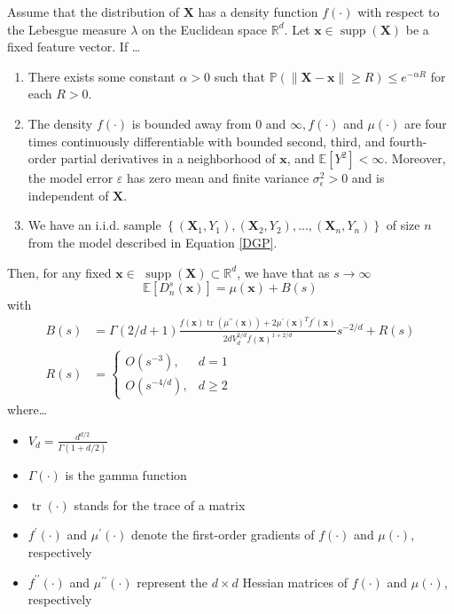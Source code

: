 \documentclass[letterpaper,10pt]{article}
\numberwithin{equation}{section}
\numberwithin{theorem}{section}
\numberwithin{remark}{section}
\numberwithin{example}{section}
\theoremstyle{definition}
\newcommand{\1}{\mathbb{1}}
\begin{document}
\vspace{0.5cm}
\begin{theorem}\label{demirkaya_Thm1}
	Assume that the distribution of $\mathbf{X}$ has a density function $f(\cdot)$ with respect to the Lebesgue measure $\lambda$ on the Euclidean space $\mathbb{R}^d$.
	Let $\mathbf{x} \in \operatorname{supp}(\mathbf{X})$ be a fixed feature vector.
	If \dots
	\begin{enumerate}
		\item There exists some constant $\alpha>0$ such that $\mathbb{P}(\|\mathbf{X}-\mathbf{x}\| \geq R) \leq e^{-\alpha R}$ for each $R>0$.
		\item The density $f(\cdot)$ is bounded away from 0 and $\infty, f(\cdot)$ and $\mu(\cdot)$ are four times continuously differentiable with bounded second, third, and fourth-order partial derivatives in a neighborhood of $\mathbf{x}$, and $\mathbb{E}[Y^2]<\infty$.
		      Moreover, the model error $\varepsilon$ has zero mean and finite variance $\sigma_\epsilon^2>0$ and is independent of $\mathbf{X}$.
		\item We have an i.i.d. sample $\left\{\left(\mathbf{X}_1, Y_1\right),\left(\mathbf{X}_2, Y_2\right), \dotsc,\left(\mathbf{X}_n, Y_n\right)\right\}$ of size $n$ from the model described in Equation \ref{DGP}.
	\end{enumerate}
	Then, for any fixed $\mathbf{x} \in$ $\operatorname{supp}(\mathbf{X}) \subset \mathbb{R}^d$, we have that as $s \rightarrow \infty$
	\begin{equation}
		\mathbb{E}\left[D_n^{s}(\mathbf{x})\right] = \mu(\mathbf{x})+B(s)
	\end{equation}
	with
	\begin{align*}
		B(s) & =\Gamma(2 / d+1) \frac{f(\mathbf{x}) \operatorname{tr}\left(\mu^{\prime \prime}(\mathbf{x})\right)+2 \mu^{\prime}(\mathbf{x})^T f^{\prime}(\mathbf{x})}{2 d V_d^{2 / d} f(\mathbf{x})^{1+2 / d}} s^{-2 / d}+R(s) \\
		R(s) & = \begin{cases}O\left(s^{-3}\right),     & d=1      \\
             O\left(s^{-4 / d}\right), & d \geq 2\end{cases}
	\end{align*}
	where\dots
	\begin{multicols*}{2}
		\begin{itemize}
			\item $V_d=\frac{d^{d / 2}}{\Gamma(1+d / 2)}$
			\item $\Gamma(\cdot)$ is the gamma function
			\item $\operatorname{tr}(\cdot)$ stands for the trace of a matrix
			\item $f^{\prime}(\cdot)$ and $\mu^{\prime}(\cdot)$ denote the first-order gradients of $f(\cdot)$ and $\mu(\cdot)$, respectively
			\item $f^{\prime \prime}(\cdot)$ and $\mu^{\prime \prime}(\cdot)$ represent the $d \times d$ Hessian matrices of $f(\cdot)$ and $\mu(\cdot)$, respectively
		\end{itemize}
	\end{multicols*}
\end{theorem}
\end{document}
